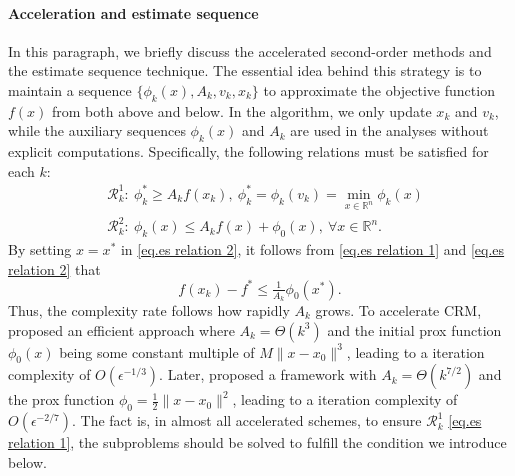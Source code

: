 \documentclass{article}
\begin{document}
\paragraph{Acceleration and estimate sequence}
In this paragraph, we briefly discuss the accelerated second-order methods and the estimate sequence technique. The essential idea behind this strategy is to maintain a sequence $\{\phi_k(x),A_k,v_k,x_k\}$ to approximate the objective function $f(x)$ from both above and below. In the algorithm, we only update $x_k$ and $v_k$, while the auxiliary sequences $\phi_k(x)$ and $A_k$ are used in the analyses without explicit computations. Specifically, the following relations must be satisfied for each $k$:
\begin{subequations}\label{eq.es relation}
\begin{align}
    \label{eq.es relation 1}
     & \mathcal{R}_k^1: \ \phi_k^*  \geq A_k f(x_k), \  \phi_k^*= \phi_k(v_k) =\min_{x\in\mathbb{R}^n}\phi_k(x) \\
    \label{eq.es relation 2}
     & \mathcal{R}_k^2: \ \phi_k(x)\leq A_kf(x)+\phi_0(x), \ \forall x\in\mathbb{R}^n.
\end{align}
\end{subequations}
By setting $x = x^*$ in \eqref{eq.es relation 2}, it follows from \eqref{eq.es relation 1} and \eqref{eq.es relation 2} that
\begin{equation*}
    f(x_k)-f^* \leq \tfrac{1}{A_k}\phi_0(x^*).
\end{equation*}
Thus, the complexity rate follows how rapidly $A_k$ grows. To accelerate CRM, \citet{nesterov2008accelerating} proposed an efficient approach where $A_k=\Theta(k^3)$ and the initial prox function $\phi_0(x)$ being some constant multiple of $M\|x-x_0\|^3$, leading to a iteration complexity of $O(\epsilon^{-1/3})$. Later, \citet{monteiro2013accelerated} proposed a framework with $A_k = \Theta(k^{7/2})$ and the prox function $\phi_0=\frac{1}{2}\|x-x_0\|^2$, leading to a iteration complexity of $O(\epsilon^{-2/7})$. The fact is, in almost all accelerated schemes, to ensure $\mathcal{R}_k^1$ \eqref{eq.es relation 1}, the subproblems should be solved to fulfill the condition we introduce below.
\end{document}
